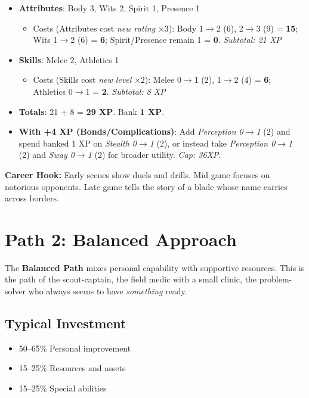 \begin{itemize}
\item \textbf{Attributes}: Body 3, Wits 2, Spirit 1, Presence 1
  \begin{itemize}
  \item Costs (Attributes cost \emph{new rating} \(\times 3\)):  
        Body 1\(\to\)2 (6), 2\(\to\)3 (9) = \textbf{15};  
        Wits 1\(\to\)2 (6) = \textbf{6};  
        Spirit/Presence remain 1 = \textbf{0}.  
        \emph{Subtotal: 21 XP}
  \end{itemize}
\item \textbf{Skills}: Melee 2, Athletics 1
  \begin{itemize}
  \item Costs (Skills cost \emph{new level} \(\times 2\)):  
        Melee 0\(\to\)1 (2), 1\(\to\)2 (4) = \textbf{6};  
        Athletics 0\(\to\)1 = \textbf{2}.  
        \emph{Subtotal: 8 XP}
  \end{itemize}
\item \textbf{Totals}: 21 + 8 = \textbf{29 XP}. Bank \textbf{1 XP}.
\item \textbf{With +4 XP (Bonds/Complications)}:  
  Add \emph{Perception 0\(\to\)1} (2) and spend banked 1 XP on \emph{Stealth 0\(\to\)1} (2),  
  or instead take \emph{Perception 0\(\to\)1} (2) and \emph{Sway 0\(\to\)1} (2) for broader utility.  
  \emph{Cap: 36XP}.
\end{itemize}

\noindent\textbf{Career Hook:} Early scenes show duels and drills. Mid game focuses on
notorious opponents. Late game tells the story of a blade whose name carries
across borders.


\section{Path 2: Balanced Approach}
\label{sec:xp-balanced-path}

The \textbf{Balanced Path} mixes personal capability with supportive resources.
This is the path of the scout-captain, the field medic with a small clinic, the
problem-solver who always seems to have \emph{something} ready.

\subsection*{Typical Investment}
\begin{itemize}
\item 50--65\% Personal improvement
\item 15--25\% Resources and assets
\item 15--25\% Special abilities
\end{itemize}

